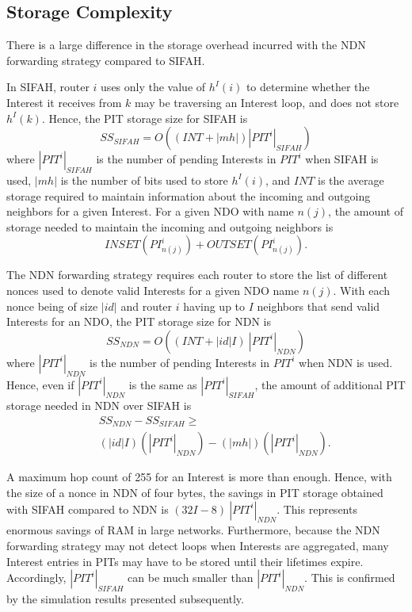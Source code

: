 \documentclass{ancs15-alternate}
\begin{document}
\subsection{Storage Complexity}

There is a large difference in the storage overhead incurred with 
the NDN  forwarding strategy compared to SIFAH.

In SIFAH, router $i$ uses only the value of $h^I(i)$ to determine whether the Interest it receives from $k$ may be traversing an Interest loop, and does not store $h^I(k)$. Hence, the PIT storage size 
for SIFAH is  
\[
SS_{SIFAH} = O(( INT + |mh| )  |PIT^i|_{SIFAH})
\]
\noindent
where $|PIT^i |_{SIFAH}$ is the number of pending Interests in $PIT^i$ when SIFAH is used,  $|mh|$ is the number of bits used to store $h^I(i)$, and
$INT$ is the average storage required to maintain information about the incoming and outgoing neighbors for a given Interest.
For a given NDO with name $n(j)$, the amount of storage needed to maintain the incoming and outgoing neighbors is 
\[
INSET(PI^i_{n(j)}) + OUTSET(PI^i_{n(j)}).
\]

The NDN  forwarding strategy requires each router to store the list of different  nonces used to denote valid Interests for a given NDO name $n(j)$. With each nonce being of size $|id|$ and router $i$ having up to $I$ neighbors that send valid Interests for an NDO, the 
PIT storage size for NDN is 
\[SS_{NDN}  = O((INT + |id| I )   ~|PIT^i |_{ NDN})
\]
\noindent
 where $|PIT^i |_{ NDN}$ is the number of pending Interests in $PIT^i$ when NDN is used. 
Hence, even if $|PIT^i |_{ NDN}$ is the same as $ |PIT^i |_{ SIFAH}$, 
the amount of additional PIT storage needed in NDN over SIFAH is 
\begin{eqnarray*}
&&SS_{NDN}- SS_{SIFAH} \geq
\\
& & (|id| I)(|PIT^i |_{ NDN}) -  (|mh|) (|PIT^i |_{ NDN}).
\end{eqnarray*}

A   maximum hop count  of 255 for an Interest
is more than enough. Hence,  with the  size of  a nonce  in NDN of four bytes, the savings in PIT storage obtained with SIFAH  compared to NDN  is
$(32 I - 8)~|PIT^i |_{ NDN}$. This  represents enormous savings   of RAM in large networks.
Furthermore, because the NDN forwarding strategy may not detect loops when Interests are aggregated,  many Interest entries in PITs 
may have to be stored until their lifetimes expire. Accordingly, 
$|PIT^i |_{SIFAH}$ can be much smaller than $|PIT^i |_{ NDN}$. This is confirmed by the simulation results presented subsequently.
\end{document}
